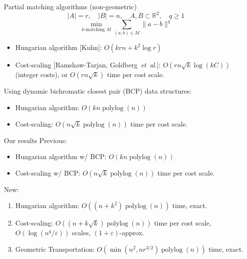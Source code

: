 \documentclass[xcolor={dvipsnames,usenames},handout]{beamer} %
\newcommand{\etal}{\textit{et~al.}}
\newcommand{\reals}{\mathbb{R}}
\newcommand{\eps}{\varepsilon}
\DeclareMathOperator{\polylog}{polylog}
\begin{document}
\begin{frame}{Partial matching algorithms (non-geometric)}
\begin{equation*}
|A| = r, \quad |B| = n, \quad A, B \subset \reals^2, \quad q \geq 1 
\end{equation*}
\begin{equation*}
\min_{k \text{-matching } M}\sum_{(a, b) \in M} \|a - b\|^q
\end{equation*}
\begin{itemize}
\item Hungarian algorithm [Kuhn]: $O(krn + k^2\log r)$
\item Cost-scaling [Ramshaw-Tarjan, Goldberg~\etal]: $O(rn\sqrt{k}\log(kC))$ (integer costs),
	or $O(rn\sqrt{k})$ time per cost scale.
\end{itemize}
\pause
\vspace{10pt}
Using dynamic bichromatic closest pair (BCP) data structures:
\begin{itemize}
\item Hungarian algorithm: $O(kn\polylog(n))$
\item Cost-scaling: $O(n\sqrt{k}\polylog(n))$ time per cost scale.
\end{itemize}
\end{frame}

\begin{frame}{Our results}
Previous:
\begin{itemize}
\item Hungarian algorithm w/ BCP: $O(kn\polylog(n))$
\item Cost-scaling w/ BCP: $O(n\sqrt{k}\polylog(n))$ time per cost scale.
\end{itemize}
\pause
\vspace{10pt}

New:
\begin{enumerate}
\item Hungarian algorithm: $O((n+k^2)\polylog(n))$ time, exact.
\item Cost-scaling: $O((n+k\sqrt{k})\polylog(n))$ time per cost scale,
	$O(\log(n^q/\eps))$ scales, $(1+\eps)$-approx.
\pause
\vspace{10pt}
\item Geometric Transportation: $O(\min(n^2, nr^{3/2})\polylog(n))$ time, exact.
\end{enumerate}
\end{frame}
\end{document}
